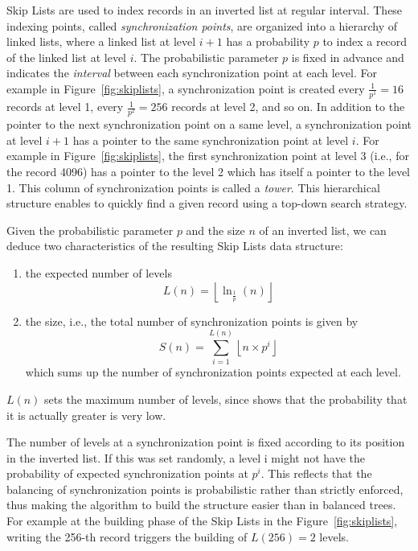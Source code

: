 Skip Lists are used to index records in an inverted list at regular interval.
These indexing points, called \emph{synchronization points}, are organized
into a hierarchy of linked lists, where a linked list at level $i+1$ has a
probability $p$ to index a record of the linked list at level $i$. The
probabilistic parameter $p$ is fixed in advance and indicates the
\emph{interval} between each synchronization point at each level. For example
in Figure~\ref{fig:skiplists}, a synchronization point is created every
$\frac{1}{p^1} = 16$ records at level 1, every $\frac{1}{p^2} = 256$ records
at level 2, and so on. In addition to the pointer to the next synchronization
point on a same level, a synchronization point at level $i+1$ has a pointer to
the same synchronization point at level $i$. For example in
Figure~\ref{fig:skiplists}, the first synchronization point at level 3 (i.e.,
for the record 4096) has a pointer to the level 2 which has itself a pointer
to the level 1. This column of synchronization points is called a \emph{tower}.
This hierarchical structure enables to quickly find a given record using a
top-down search strategy.

Given the probabilistic parameter $p$ and the size $n$ of an inverted list, we
can deduce two characteristics of the resulting Skip Lists data structure: 
\begin{enumerate}
\item the expected number of levels
\begin{equation}
L(n)=\left\lfloor \ln_{\frac{1}{p}}(n)\right\rfloor
\label{eq:skiplists-maxlevels}
\end{equation}
\item the size, i.e., the total number of synchronization points is given by
\begin{equation}
S(n)=\sum_{i=1}^{L\left(n\right)}{\left\lfloor n\times p^i \right\rfloor}
\label{eq:skiplists-size}
\end{equation}
which sums up the number of synchronization points expected at each level. 
\end{enumerate}
$L(n)$ sets the maximum number of levels, since \cite{pugh:90} shows that
the probability that it is actually greater is very low.

The number of levels at a synchronization point is fixed according to its
position in the inverted list. If this was set randomly, a level i might not
have the probability of expected synchronization points at $p^i$. This reflects
that the balancing of synchronization points is probabilistic rather than
strictly enforced, thus making the algorithm to build the structure easier than
in balanced trees. For example at the building phase of the Skip Lists in the
Figure~\ref{fig:skiplists}, writing the 256-th record triggers the building of
$L(256)=2$ levels.

